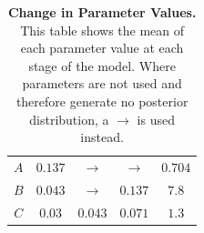 \begin{table}[tbp]
\begin{center}
\begin{tabular}{ccccc}
$A$ & $0.137$ & $\rightarrow$ & $\rightarrow$ & $0.704$
\tabularnewline\noalign{\smallskip}\hline\noalign{\smallskip}

$B$ & $0.043$ & $\rightarrow$ & $0.137$ & $7.8$
\tabularnewline\noalign{\smallskip}\hline\noalign{\smallskip}

$C$ & $0.03$ & $0.043$ & $0.071$ & $1.3$
\tabularnewline
\bottomrule
\end{tabular}
\caption[Change in Parameter Values]{{\bf Change in Parameter Values.} This table shows the mean of each parameter value at each stage of the model. Where parameters are not used and therefore generate no posterior distribution, a $\rightarrow$ is used instead.
\label{tab:parameter_changes}}
\end{center}
\end{table}

